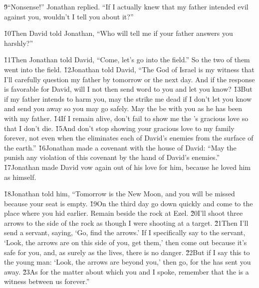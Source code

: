 \v{9}``Nonsense!'' Jonathan replied. ``If I actually knew that my father intended evil against you, wouldn't I tell you about it?''

\v{10}Then David told Jonathan, ``Who will tell me if your father answers you harshly?''

\v{11}Then Jonathan told David, ``Come, let's go into the field.'' So the two of them went into the field. \v{12}Jonathan told David, ``The  God of Israel is my witness that I'll carefully question my father by tomorrow or the next day. And if the response is favorable for David, will I not then send word to you and let you know? \v{13}But if my father intends to harm you, may the  strike me dead if I don't let you know and send you away so you may go safely. May the  be with you as he has been with my father. \v{14}If I remain alive, don't fail to show me the 's gracious love so that I don't die. \v{15}And don't stop showing your gracious love to my family forever, not even when the  eliminates each of David's enemies from the surface of the earth.'' \v{16}Jonathan made a covenant with the house of David: ``May the  punish any violation of this covenant by the hand of David's enemies.'' \v{17}Jonathan made David vow again out of his love for him, because he loved him as himself.

\v{18}Jonathan told him, ``Tomorrow is the New Moon, and you will be missed because your seat is empty. \v{19}On the third day go down quickly and come to the place where you hid earlier. Remain beside the rock at Ezel. \v{20}I'll shoot three arrows to the side of the rock as though I were shooting at a target. \v{21}Then I'll send a servant, saying, `Go, find the arrows.' If I specifically say to the servant, `Look, the arrows are on this side of you, get them,' then come out because it's safe for you, and, as surely as the  lives, there is no danger. \v{22}But if I say this to the young man: `Look, the arrows are beyond you,' then go, for the  has sent you away. \v{23}As for the matter about which you and I spoke, remember that the  is a witness between us forever.''


